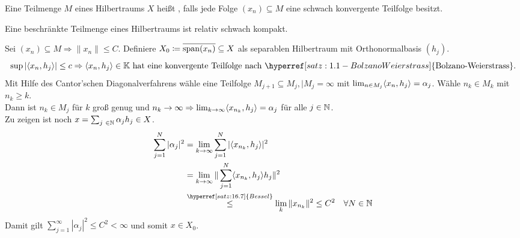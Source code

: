\begin{definition} 
	Eine Teilmenge $M$ eines Hilbertraums $X$ hei{\ss}t , falls jede Folge $(x_{n}) \subseteq M$ eine schwach konvergente Teilfolge besitzt.
\end{definition}


\begin{satz}
	Eine beschränkte Teilmenge eines Hilbertraums ist relativ schwach kompakt.	
\end{satz}

\begin{beweis}
	Sei $(x_{n}) \subseteq M \Rightarrow \| x_{n} \| \leq C$. Definiere $X_{0} \coloneqq \overline{\operatorname{span}(x_{n})} \subseteq X$ als separablen Hilbertraum mit Orthonormalbasis $(h_{j})$.	
		\[ \sup | \< x_{n} , h_{j} \> | \leq c \Rightarrow \< x_{n} , h_{j} \> \in \MdK \text{ hat eine konvergente Teilfolge nach } \hyperref[satz:1.1-BolzanoWeierstrass]{\text{Bolzano-Weierstrass}}. \]
		Mit Hilfe des Cantor'schen Diagonalverfahrens wähle eine Teilfolge $M_{j+1} \subseteq M_{j}, |M_{j} = \infty$ mit $\lim_{n \in M_{j}} \langle x_{n} , h_{j} \rangle = \alpha_{j}$. Wähle $n_{k} \in M_{k}$ mit $n_{k} \geq k$. \\
		Dann ist $n_{k} \in M_{j}$ für $k$ gro{\ss} genug und $n_{k} \rightarrow \infty \Rightarrow \lim_{k \rightarrow \infty} \langle x_{n_{k}} , h_{j} \rangle = \alpha_{j}$ für alle $j \in \mathbb{N}$. \\
		Zu zeigen ist noch $x = \sum_{j \in \MdN} \alpha_{j} h_{j} \in X$.
		\begin{align*}
			\sum_{j = 1}^{N} | \alpha_{j} |^{2} & = \lim_{k \rightarrow \infty} \sum_{j = 1}^{N} | \< x_{n_{k}} , h_{j} \> |^{2} \\
				& = \lim_{k \rightarrow \infty} \| \sum_{j = 1}^{N} \< x_{n_{k}} , h_{j} \> h_{j} \|^{2} \\
				& \overset{\hyperref[satz:16.7]{Bessel}}{\leq} \lim_{k} \| x_{n_{k}} \|^{2} \leq C^{2} \quad \forall N \in \MdN
		\end{align*}
		Damit gilt $\sum_{j = 1}^{\infty} | \alpha_{j} |^{2} \leq C^{2} < \infty$ und somit $x \in X_{0}$.
\end{beweis}



\newpage